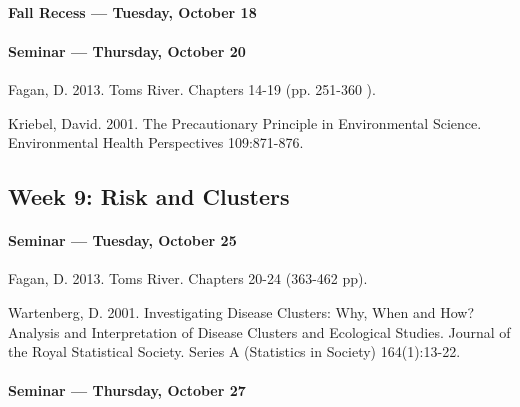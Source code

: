       \paragraph{Fall Recess --- Tuesday, October 18}
    
      
      \paragraph{Seminar --- Thursday, October 20}
      
      \begin{itemize*}
      
      \item Fagan, D. 2013. Toms River. Chapters 14-19 (pp. 251-360 ).
      \item Kriebel, David. 2001. The Precautionary Principle in Environmental Science. Environmental Health Perspectives 109:871-876.					
      \end{itemize*}
      
      
      \subsection{\textbf{Week 9:} Risk and Clusters}
      
      \paragraph{Seminar --- Tuesday, October 25}
      
      \begin{itemize*}
      \item Fagan, D. 2013. Toms River. Chapters 20-24 (363-462 pp).
      \item Wartenberg, D. 2001. Investigating Disease Clusters: Why, When and How? Analysis and Interpretation of Disease Clusters and Ecological Studies. Journal of the Royal Statistical Society. Series A (Statistics in Society) 164(1):13-22.
      \end{itemize*}
      
      \paragraph{Seminar --- Thursday, October 27}
      
